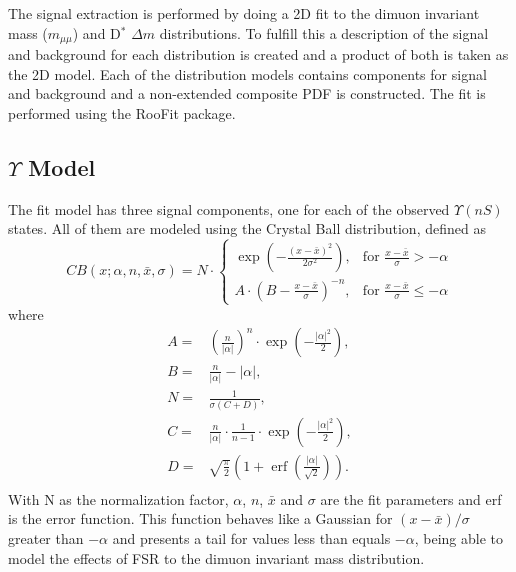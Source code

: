 The signal extraction is performed by doing a 2D fit to the dimuon invariant mass ($m_{\mu\mu}$) and D$^*$ $\Delta m$ distributions. To fulfill this a description of the signal and background for each distribution is created and a product of both is taken as the 2D model. Each of the distribution models contains components for signal and background and a non-extended composite PDF is constructed. The fit is performed using the RooFit package.

\subsection{\texorpdfstring{$\Upsilon$}{Y} Model}

The fit model has three signal components, one for each of the observed $\Upsilon(nS)$ states. All of them are modeled using the Crystal Ball distribution, defined as
\begin{equation}
  CB(x;\alpha,n,\bar x,\sigma) = N \cdot
  \begin{cases}
    \exp(- \frac{(x - \bar x)^2}{2 \sigma^2}),    & \mbox{for }\frac{x - \bar x}{\sigma} > -\alpha         \\
    A \cdot (B - \frac{x - \bar x}{\sigma})^{-n}, & \mbox{for }\frac{x - \bar x}{\sigma} \leqslant -\alpha
  \end{cases}
\end{equation}
where
\begin{equation}
  \begin{split}
    A = & \left(\frac{n}{\left| \alpha \right|}\right)^n \cdot \exp\left(- \frac {\left| \alpha \right|^2}{2}\right), \\
    B = & \frac{n}{\left| \alpha \right|}  - \left| \alpha \right|, \\
    N = & \frac{1}{\sigma (C + D)}, \\
    C = & \frac{n}{\left| \alpha \right|} \cdot \frac{1}{n-1} \cdot \exp\left(- \frac {\left| \alpha \right|^2}{2}\right), \\
    D = & \sqrt{\frac{\pi}{2}} \left(1 + \operatorname{erf}\left(\frac{\left| \alpha \right|}{\sqrt 2}\right)\right). \\
  \end{split}
\end{equation}
With N as the normalization factor, $\alpha$, $n$, $\bar x$ and $\sigma$ are the fit parameters and erf is the error function. This function behaves like a Gaussian for $(x-\bar x)/\sigma$ greater than $-\alpha$ and presents a tail for values less than equals $-\alpha$, being able to model the effects of FSR to the dimuon invariant mass distribution.

